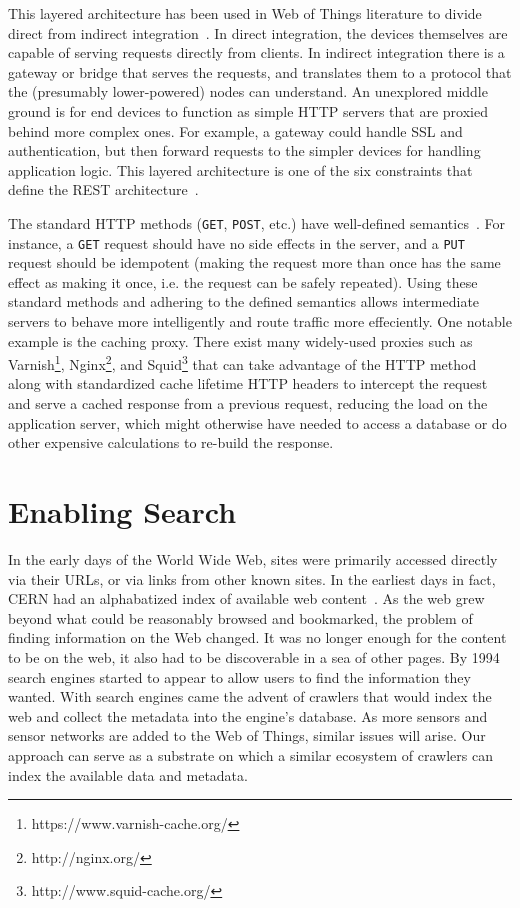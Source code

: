 \documentclass{acm_proc_article-sp}
\begin{document}
This layered architecture has been used in Web of Things literature to
divide direct from indirect integration~\cite{wotsurvey}. In direct
integration, the devices themselves are capable of serving requests directly
from clients. In indirect integration there is a gateway or bridge that serves
the requests, and translates them to a protocol that the (presumably
lower-powered) nodes can understand. An unexplored middle ground is for end
devices to function as simple HTTP servers that are proxied behind more complex
ones. For example, a gateway could handle SSL and authentication, but then
forward requests to the simpler devices for handling application logic. This
layered architecture is one of the six constraints that define the REST
architecture~\cite{fielding}.

The standard HTTP methods (\texttt{GET}, \texttt{POST}, etc.) have well-defined
semantics~\cite{httpmethods}. For instance, a \texttt{GET} request should have
no side effects in the server, and a \texttt{PUT} request should be idempotent
(making the request more than once has the same effect as making it once, i.e.
the request can be safely repeated). Using these standard methods and adhering
to the defined semantics allows intermediate servers to behave more
intelligently and route traffic more effeciently. One notable example is the
caching proxy.  There exist many widely-used proxies such as
Varnish\footnote{https://www.varnish-cache.org/},
Nginx\footnote{http://nginx.org/}, and
Squid\footnote{http://www.squid-cache.org/} that can take advantage of the HTTP
method along with standardized cache lifetime HTTP headers to intercept the
request and serve a cached response from a previous request, reducing the load
on the application server, which might otherwise have needed to access a
database or do other expensive calculations to re-build the response.

\section{Enabling Search}

In the early days of the World Wide Web, sites were primarily accessed directly
via their URLs, or via links from other known sites. In the earliest days in
fact, CERN had an alphabatized index of available web
content~\cite{websearchengines}. As the web grew beyond what could be
reasonably browsed and bookmarked, the problem of finding information on the
Web changed. It was no longer enough for the content to be on the web, it also
had to be discoverable in a sea of other pages. By 1994 search engines started
to appear to allow users to find the information they wanted. With search
engines came the advent of crawlers that would index the web and collect the
metadata into the engine's database. As more sensors and sensor networks are
added to the Web of Things, similar issues will arise. Our approach can serve
as a substrate on which a similar ecosystem of crawlers can index the available
data and metadata.
\end{document}
